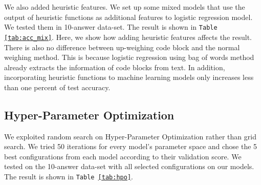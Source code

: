 \documentclass[11pt]{article}
\begin{document}
We also added heuristic features. We set up some mixed models that use the output of heuristic functions as additional features to logistic regression model. We tested them in 10-answer data-set. The result is shown in \texttt{Table \ref{tab:acc_mix}}.
Here, we show how adding heuristic features affects the result.
There is also no difference between up-weighing code block and the normal weighing method. This is because logistic regression using bag of words method already extracts the information of code blocks from text. In addition, incorporating heuristic functions to machine learning models only increases less than one percent of test accuracy.

\subsection{Hyper-Parameter Optimization}
We exploited random search on Hyper-Parameter Optimization  \cite{Bergstra2012} rather than grid search.  We tried 50 iterations for every model's parameter space and chose the 5 best configurations  from each model according to their validation score.  We tested on the 10-answer data-set with all selected configurations on our models. The result is shown in \texttt{Table \ref{tab:hpo}}.
\end{document}
